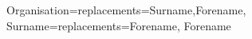 \documentclass[12pt]{article}
\begin{document}
{
 Organisation={replacements={Surname,Forename}},
 Surname={replacements={Forename}},
 Forename
} 

\end{document}
